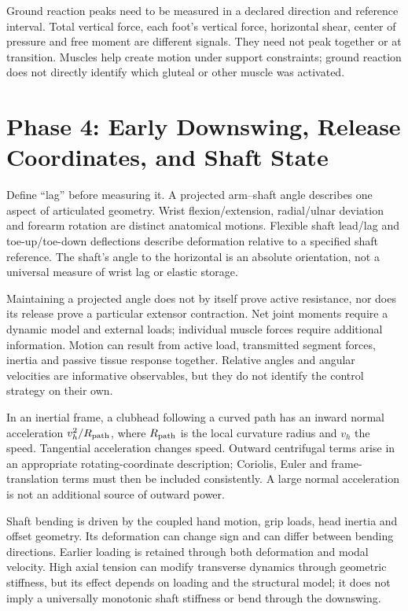 Ground reaction peaks need to be measured in a declared direction and reference interval. Total vertical force, each foot's vertical force, horizontal shear, center of pressure and free moment are different signals. They need not peak together or at transition. Muscles help create motion under support constraints; ground reaction does not directly identify which gluteal or other muscle was activated.

\section{Phase 4: Early Downswing, Release Coordinates, and Shaft State}

Define ``lag'' before measuring it. A projected arm--shaft angle describes one aspect of articulated geometry. Wrist flexion/extension, radial/ulnar deviation and forearm rotation are distinct anatomical motions. Flexible shaft lead/lag and toe-up/toe-down deflections describe deformation relative to a specified shaft reference. The shaft's angle to the horizontal is an absolute orientation, not a universal measure of wrist lag or elastic storage.

Maintaining a projected angle does not by itself prove active resistance, nor does its release prove a particular extensor contraction. Net joint moments require a dynamic model and external loads; individual muscle forces require additional information. Motion can result from active load, transmitted segment forces, inertia and passive tissue response together. Relative angles and angular velocities are informative observables, but they do not identify the control strategy on their own.

In an inertial frame, a clubhead following a curved path has an inward normal acceleration $v_h^2/R_{\rm path}$, where $R_{\rm path}$ is the local curvature radius and $v_h$ the speed. Tangential acceleration changes speed. Outward centrifugal terms arise in an appropriate rotating-coordinate description; Coriolis, Euler and frame-translation terms must then be included consistently. A large normal acceleration is not an additional source of outward power.

Shaft bending is driven by the coupled hand motion, grip loads, head inertia and offset geometry. Its deformation can change sign and can differ between bending directions. Earlier loading is retained through both deformation and modal velocity. High axial tension can modify transverse dynamics through geometric stiffness, but its effect depends on loading and the structural model; it does not imply a universally monotonic shaft stiffness or bend through the downswing.

